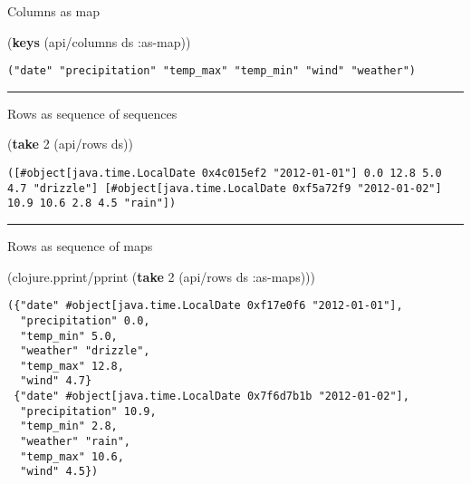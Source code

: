 \documentclass[]{article}
\newenvironment{Shaded}{\begin{snugshade}}{\end{snugshade}}
\newcommand{\AttributeTok}[1]{\textcolor[rgb]{0.77,0.63,0.00}{#1}}
\newcommand{\DecValTok}[1]{\textcolor[rgb]{0.00,0.00,0.81}{#1}}
\newcommand{\KeywordTok}[1]{\textcolor[rgb]{0.13,0.29,0.53}{\textbf{#1}}}
\newcommand{\NormalTok}[1]{#1}
\begin{document}
Columns as map

\begin{Shaded}
\begin{Highlighting}[]
\NormalTok{(}\KeywordTok{keys}\NormalTok{ (api/columns ds }\AttributeTok{:as-map}\NormalTok{))}
\end{Highlighting}
\end{Shaded}

\begin{verbatim}
("date" "precipitation" "temp_max" "temp_min" "wind" "weather")
\end{verbatim}

\begin{center}\rule{0.5\linewidth}{0.5pt}\end{center}

Rows as sequence of sequences

\begin{Shaded}
\begin{Highlighting}[]
\NormalTok{(}\KeywordTok{take} \DecValTok{2}\NormalTok{ (api/rows ds))}
\end{Highlighting}
\end{Shaded}

\begin{verbatim}
([#object[java.time.LocalDate 0x4c015ef2 "2012-01-01"] 0.0 12.8 5.0 4.7 "drizzle"] [#object[java.time.LocalDate 0xf5a72f9 "2012-01-02"] 10.9 10.6 2.8 4.5 "rain"])
\end{verbatim}

\begin{center}\rule{0.5\linewidth}{0.5pt}\end{center}

Rows as sequence of maps

\begin{Shaded}
\begin{Highlighting}[]
\NormalTok{(clojure.pprint/pprint (}\KeywordTok{take} \DecValTok{2}\NormalTok{ (api/rows ds }\AttributeTok{:as-maps}\NormalTok{)))}
\end{Highlighting}
\end{Shaded}

\begin{verbatim}
({"date" #object[java.time.LocalDate 0xf17e0f6 "2012-01-01"],
  "precipitation" 0.0,
  "temp_min" 5.0,
  "weather" "drizzle",
  "temp_max" 12.8,
  "wind" 4.7}
 {"date" #object[java.time.LocalDate 0x7f6d7b1b "2012-01-02"],
  "precipitation" 10.9,
  "temp_min" 2.8,
  "weather" "rain",
  "temp_max" 10.6,
  "wind" 4.5})
\end{verbatim}
\end{document}
